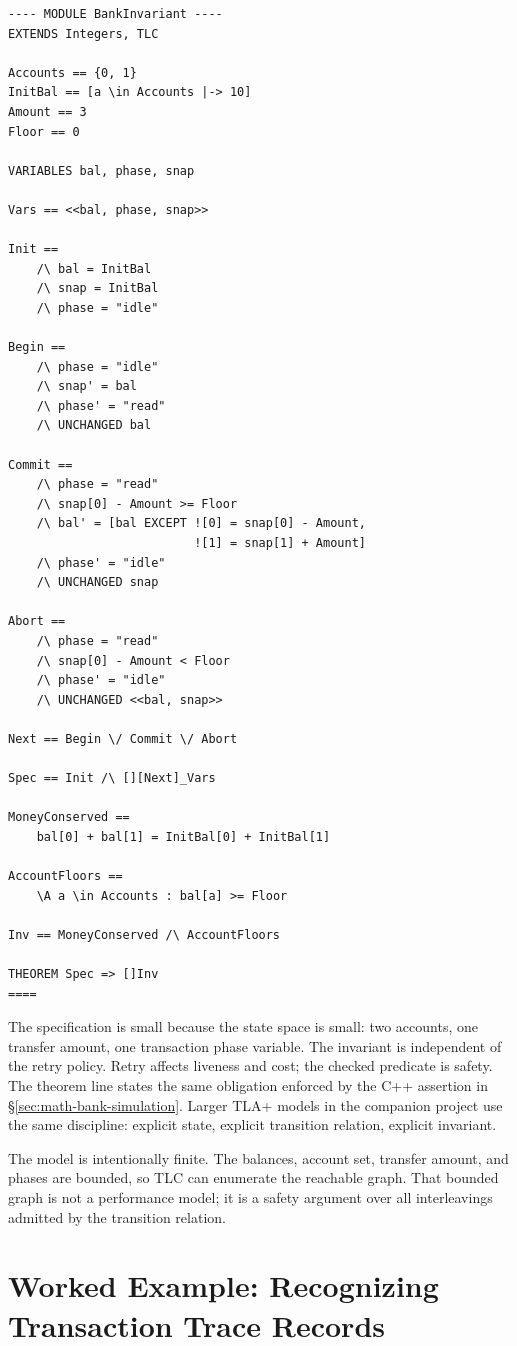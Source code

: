 \begin{lstlisting}[caption={A model-checkable TLA+ specification for a two-account transfer.}]
---- MODULE BankInvariant ----
EXTENDS Integers, TLC

Accounts == {0, 1}
InitBal == [a \in Accounts |-> 10]
Amount == 3
Floor == 0

VARIABLES bal, phase, snap

Vars == <<bal, phase, snap>>

Init ==
    /\ bal = InitBal
    /\ snap = InitBal
    /\ phase = "idle"

Begin ==
    /\ phase = "idle"
    /\ snap' = bal
    /\ phase' = "read"
    /\ UNCHANGED bal

Commit ==
    /\ phase = "read"
    /\ snap[0] - Amount >= Floor
    /\ bal' = [bal EXCEPT ![0] = snap[0] - Amount,
                          ![1] = snap[1] + Amount]
    /\ phase' = "idle"
    /\ UNCHANGED snap

Abort ==
    /\ phase = "read"
    /\ snap[0] - Amount < Floor
    /\ phase' = "idle"
    /\ UNCHANGED <<bal, snap>>

Next == Begin \/ Commit \/ Abort

Spec == Init /\ [][Next]_Vars

MoneyConserved ==
    bal[0] + bal[1] = InitBal[0] + InitBal[1]

AccountFloors ==
    \A a \in Accounts : bal[a] >= Floor

Inv == MoneyConserved /\ AccountFloors

THEOREM Spec => []Inv
====
\end{lstlisting}

The specification is small because the state space is small: two accounts, one transfer amount, one transaction phase variable. The invariant is independent of the retry policy. Retry affects liveness and cost; the checked predicate is safety. The theorem line states the same obligation enforced by the C++ assertion in \S\ref{sec:math-bank-simulation}. Larger TLA+ models in the companion project use the same discipline: explicit state, explicit transition relation, explicit invariant.

The model is intentionally finite. The balances, account set, transfer amount, and phases are bounded, so TLC can enumerate the reachable graph. That bounded graph is not a performance model; it is a safety argument over all interleavings admitted by the transition relation.

\section{Worked Example: Recognizing Transaction Trace Records}

